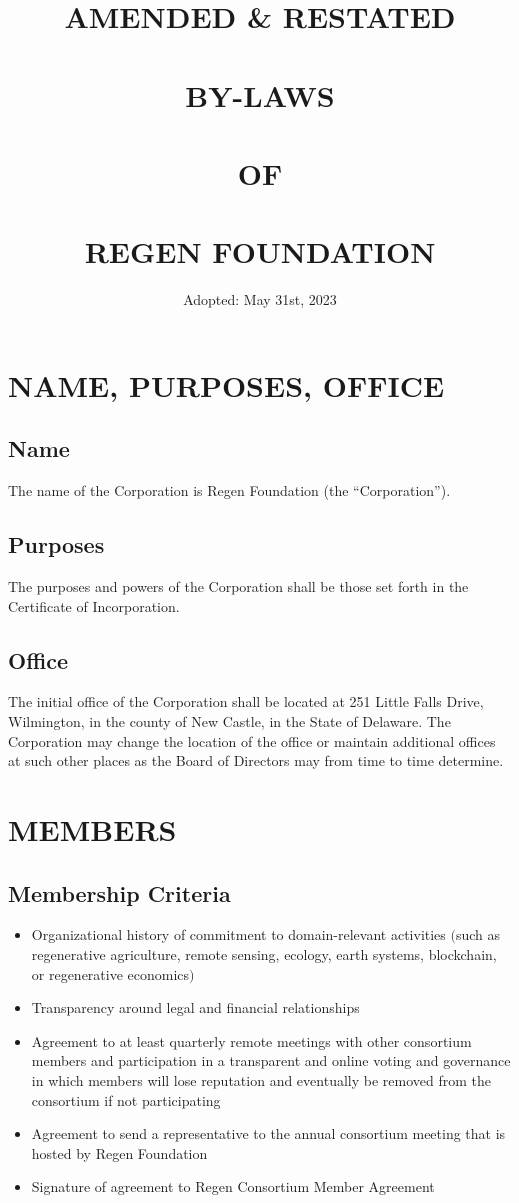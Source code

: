 \documentclass{article}
\begin{document}
\title{AMENDED \& RESTATED \\ \hfill \\ BY-LAWS \\ \hfill \\ OF \\ \hfill \\ REGEN FOUNDATION}
\author{ Adopted: May 31st, 2023}
\date{} 
\maketitle
\clearpage
\tableofcontents
\clearpage
\section{NAME, PURPOSES, OFFICE}
\subsection{Name}
The name of the Corporation is Regen Foundation (the “Corporation”).
\subsection{Purposes}
  The purposes and powers of the Corporation shall be those set forth in the Certificate of Incorporation.
\subsection{Office}
  The initial office of the Corporation shall be located at 251 Little Falls Drive, Wilmington, in the county of New Castle, in the State of Delaware.  The Corporation may change the location of the office or maintain additional offices at such other places as the Board of Directors may from time to time determine.
\section{MEMBERS}
\subsection{Membership Criteria}
\begin{itemize}
\item Organizational history of commitment to domain-relevant activities $($such as regenerative agriculture, remote sensing, ecology, earth systems, blockchain, or regenerative economics$)$
\item Transparency around legal and financial relationships
\item Agreement to at least quarterly remote meetings with other consortium members and participation in a transparent and online voting and governance in which members will lose reputation and eventually be removed from the consortium if not participating
\item Agreement to send a representative to the annual consortium meeting that is hosted by Regen Foundation
\item Signature of agreement to Regen Consortium Member Agreement
\end{itemize}
\end{document}
